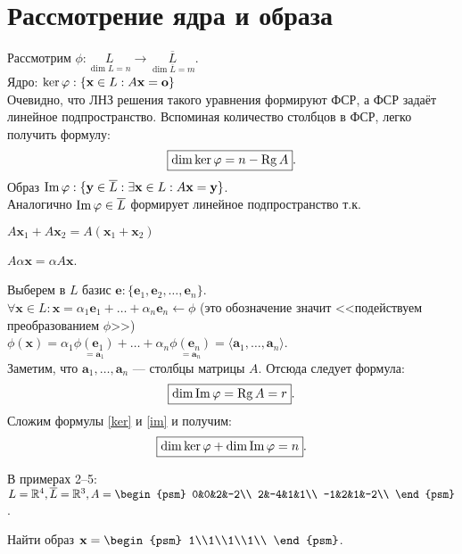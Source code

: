 \section{Рассмотрение ядра и образа}
Рассмотрим $\phi: \underset{\dim L=n}{L}\rightarrow \underset{\dim \overline{L}=m}{\overline{L}}$.\\
Ядро: $\ker\phi: \{\textbf{x} \in L: A\textbf{\textbf{x}}=\textbf{o}\}$\\
Очевидно, что ЛНЗ решения такого уравнения формируют ФСР, а ФСР задаёт линейное подпространство. Вспоминая количество столбцов в ФСР, легко получить формулу:
\begin{equation}
\boxed{\dim\ker\phi=n-\Rg A}.
\label{ker}
\end{equation}
Образ $\im\phi: \{\textbf{y} \in \overline{L}:\exists \textbf{x}\in L: A\textbf{x}=\textbf{y}\}$.\\
Аналогично $\im\phi \in \overline{L}$ формирует линейное подпространство т.к.
\begin{center}
	$
	A\textbf{x$_1$}+A\textbf{x$_2$}=A(\textbf{x$_1$}+\textbf{x$_2$})$
	
	$A\alpha \textbf{x}=\alpha A\textbf{x}$.
\end{center}
Выберем в $L$ базис $\textbf{e}:\{\textbf{e$_1$}, \textbf{e$_2$}, \dots, \textbf{e$_n$}\}$.\\
$\forall \textbf{x} \in L: \textbf{x}=\alpha_1\textbf{e$_1$}+\dots+\alpha_n\textbf{e$_n$} \leftarrow \phi$ (это обозначение значит <<подействуем преобразованием $\phi$>>)\\
$\phi(\textbf{x})=\alpha_1 \underset{=\textbf{a$_1$}}{\phi(\textbf{e$_1$})}+\dots+\alpha_n \underset{=\textbf{a$_n$}}{\phi(\textbf{e$_n$})}=\langle \textbf{a$_1$},\dots, \textbf{a$_n$}\rangle$.\\
Заметим, что $\textbf{a$_1$},\dots, \textbf{a$_n$}$ --- столбцы матрицы $A$. Отсюда следует формула:
\begin{equation}
\boxed{\dim\im\phi=\Rg A=r}.
\label{im}
\end{equation}
Сложим формулы \eqref{ker} и \eqref{im} и получим:
\begin{equation}
\boxed{\dim\ker\phi+\dim\im\phi=n}.
\end{equation}
\begin{center}
	В примерах 2--5: $L=\mathbb{R}^4, \overline{L}=\mathbb{R}^3, A=\begin{psm}
	0&0&2&-2\\
	2&-4&1&1\\
	-1&2&1&-2\\
	\end{psm}$.
\end{center}
\begin{prim}
	Найти образ $\textbf{x}=\begin{psm}
	1\\1\\1\\1\\
	\end{psm}$.
\end{prim}\\

